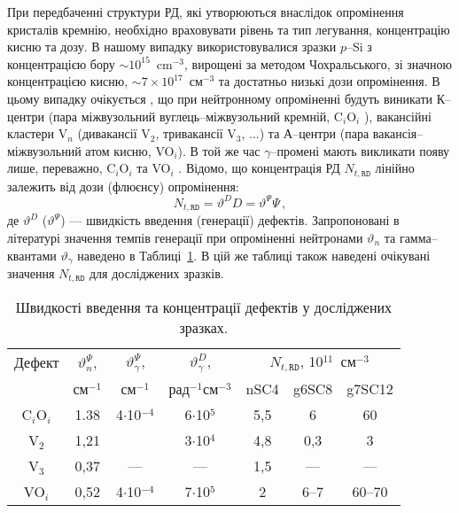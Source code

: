 При передбаченні структури РД, які утворюються внаслідок опромінення кристалів кремнію,
необхідно враховувати рівень та тип легування, концентрацію кисню та дозу.
В нашому випадку використовувалися зразки $p$--Si з концентрацією бору $\sim10^{15}$~cm$^{-3}$,
вирощені за методом Чохральського, зі значною концентрацією
кисню, $\sim7\times10^{17}$~см$^{-3}$ та достатньо низькі дози опромінення.
В цьому випадку очікується \cite{n:long,n:gamma,Moll:PhD}, що при нейтронному опроміненні будуть виникати
К--центри (пара міжвузольний вуглець--міжвузольний кремній, C$_i$O$_i$ ),
вакансійні кластери V$_n$ (дивакансії V$_2$, тривакансії V$_3$, ...) та
А--центри (пара вакансія--міжвузольний атом кисню, VO$_i$).
В той же час $\gamma$--промені мають викликати появу лише, переважно, C$_i$O$_i$ та VO$_i$ \cite{gamma:Stahl,Moll:PhD,gamma:Kolkr,A:Caracas}.
Відомо, що концентрація РД $N_{t,\mathtt{RD}}$ лінійно залежить від дози (флюєнсу) опромінення:
\begin{equation}
\label{eqNtRD}
    N_{t,\mathtt{RD}}=\vartheta^{D} D=\vartheta^{\Psi}\Psi \,,
\end{equation}
де $\vartheta^{D}$ ($\vartheta^{\Psi}$) --- швидкість введення (генерації) дефектів.
Запропоновані в літературі значення темпів генерації при опроміненні нейтронами $\vartheta_n$ та гамма--квантами $\vartheta_\gamma$
наведено в Таблиці~\ref{tabDefectNt}.
В цій же таблиці також наведені очікувані значення $N_{t,\mathtt{RD}}$ для досліджених зразків.

\begin{table}
\caption{\label{tabDefectNt}Швидкості введення та концентрації дефектів у досліджених зразках.
}
\center
\begin{tabular}{|c|c|c|c|c|c|c|}
\hline
Дефект&$\vartheta_n^{\Psi}$,  &$\vartheta_\gamma^{\Psi}$,&$\vartheta_\gamma^D$,&\multicolumn{3}{c|}{$N_{t,\mathtt{RD}}$, 10$^{11}$~см$^{-3}$}\\
\cline{5-7}
&см$^{-1}$ \cite{Moll:PhD}&см$^{-1}$ \cite{gamma:Kolkr}&рад$^{-1}$см$^{-3}$ \cite{gamma:Stahl}&nSC4&g6SC8&g7SC12\\
\hline
C$_i$O$_i$&1.38&4$\cdot$10$^{-4}$&6$\cdot$10$^5$&5,5&6&60\\ \hline
V$_2$&1,21&&3$\cdot$10$^4$&4,8&0,3&3\\ \hline
V$_3$&0,37&---&---&1,5&---&---\\ \hline
VO$_i$&0,52&4$\cdot$10$^{-4}$&7$\cdot$10$^5$&2&6--7&60--70\\\hline
\end{tabular}
\end{table}

